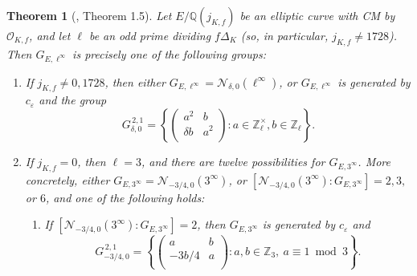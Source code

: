 \documentclass[11pt]{amsart}
\newtheorem{thm}[defn]{Theorem}
\theoremstyle{definition}
\newcommand{\Q}{\mathbb Q}
\newcommand{\Z}{\mathbb Z}
\newcommand{\Of}{\mathcal{O}_{K,f}}
\begin{document}
\begin{thm}[\cite{lozano-galoiscm}, Theorem 1.5]\label{thm-j0ell3alvaro}\label{thm-oddprimedividingdisc}
	Let $E/\Q(j_{K,f})$ be an elliptic curve with CM by $\Of$, and let $\ell$ be an odd prime dividing $f\Delta_K$ (so, in particular, $j_{K,f} \neq 1728$). Then $G_{E,\ell^\infty}$ is precisely one of the following groups:
	\begin{enumerate}
		\item[(a)] If $j_{K,f}\neq 0,1728$, then either $G_{E,\ell^\infty}=\mathcal{N}_{\delta,0}(\ell^\infty)$, or $G_{E,\ell^\infty}$ is generated by $c_{\varepsilon}$ and the group
		 \[ G^{\, 2, 1}_{\delta, 0} = \left\{ \left(\begin{array}{cc} a^2 & b\\ \delta b & a^2 \\ \end{array}\right): a \in \Z_\ell^\times, b \in \Z_\ell \right\}.\] 
		\item[(b)] If $j_{K,f}=0$, then $\ell=3$, and there are twelve possibilities for $G_{E,3^\infty}$. More concretely, either $G_{E,3^\infty}=\mathcal{N}_{-3/4,0}(3^\infty)$, or $[\mathcal{N}_{-3/4,0}(3^\infty):G_{E,3^\infty}]=2,3,$ or $6$, and one of the following holds:
		\begin{enumerate} \item[(i)] If $[\mathcal{N}_{-3/4,0}(3^\infty):G_{E,3^\infty}]=2$, then $G_{E,3^\infty}$ is generated by $c_{\varepsilon}$ and 
		\[ G^{\, 2,1}_{-3/4, 0}=\left\{ \left(\begin{array}{cc}  a & b\\ -3b/4 & a\\ \end{array}\right): a,b\in  \Z_3,\ a\equiv 1 \bmod 3\right\}. \]
		

\end{enumerate}
\end{enumerate}
\end{thm}
\end{document}
